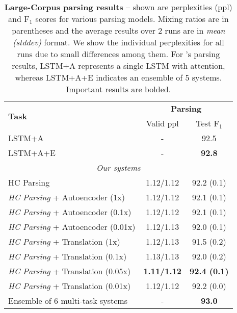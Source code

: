 \begin{table}[tbh!]
\centering
\begin{tabular}{l|c|c}
\multirow{ 2}{*}{\bf{Task}}& \multicolumn{2}{c}{{\bf
Parsing}}\\
  \cline{2-3}
  & Valid ppl & Test F$_1$\\
  \hline
  \hline
LSTM+A \citep{vinyals15grammar} &  - & 92.5 \\
LSTM+A+E \citep{vinyals15grammar} & - & {\bf 92.8} \\
  \hline
\multicolumn{3}{c}{{\it Our systems}} \\
  \hline
HC Parsing & 1.12/1.12 & 92.2 (0.1) \\
  \hline
{\it HC Parsing} + Autoencoder (1x) & 1.12/1.12 & 92.1 (0.1) \\
{\it HC Parsing} + Autoencoder (0.1x) & 1.12/1.12 & 92.1 (0.1) \\
{\it HC Parsing} + Autoencoder (0.01x) & 1.12/1.13 & 92.0 (0.1) \\
  \hline
{\it HC Parsing} + Translation (1x) & 1.12/1.13 & 91.5 (0.2) \\
{\it HC Parsing} + Translation (0.1x) & 1.13/1.13 & 92.0 (0.2) \\
{\it HC Parsing} + Translation (0.05x) & {\bf 1.11/1.12} & {\bf 92.4 (0.1)} \\
{\it HC Parsing} + Translation (0.01x) & 1.12/1.12 & 92.2 (0.0) \\
  \hline
Ensemble of 6 multi-task systems & - & {\bf 93.0} \\
\end{tabular}
\caption{{\bf Large-Corpus parsing results} -- shown are
perplexities (ppl) and F$_1$ scores 
for various parsing models. Mixing ratios are in parentheses and the average
results over 2 runs are in {\it mean (stddev)} format. We show the individual perplexities for all runs
due to small differences among them. For \citet{vinyals15grammar}'s parsing results, LSTM+A
represents a single LSTM with attention, whereas LSTM+A+E indicates an ensemble
of 5 systems. Important results are bolded.}
\label{t:big_big_parsing}
\end{table}


